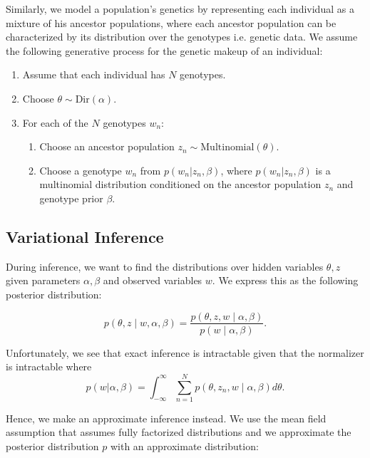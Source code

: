 \documentclass[a4paper]{article}
\begin{document}
	Similarly, we model a population's genetics by representing each individual as a mixture of his ancestor populations, where each ancestor population can be characterized by its distribution over the genotypes i.e. genetic data. We assume the following generative process for the genetic makeup of an individual:

	\begin{enumerate}[noitemsep]
		\item Assume that each individual has $N$ genotypes. 
		\item Choose $\theta \sim \mathrm{Dir}(\alpha)$.
		\item For each of the $N$ genotypes $w_n$:
		\begin{enumerate}
			\item Choose an ancestor population $z_n \sim \mathrm{Multinomial}(\theta)$.
			\item Choose a genotype $w_n$ from $p(w_n|z_n,\beta)$, where $p(w_n|z_n,\beta)$ is a multinomial distribution conditioned on the ancestor population $z_n$ and genotype prior $\beta$.
		\end{enumerate}
	\end{enumerate}
	
	\subsection{Variational Inference}
	
	During inference, we want to find the distributions over hidden variables $\theta, z$ given parameters $\alpha, \beta$ and observed variables $w$. We express this as the following posterior distribution:
	
	\begin{equation}
		p(\theta,z \mid w,\alpha,\beta) = \frac{p(\theta,z,w\mid \alpha,\beta)}{p(w\mid \alpha,\beta)}.
	\end{equation}
	
	\noindent Unfortunately, we see that exact inference is intractable given that the normalizer is intractable where
	\begin{equation}
		p(w | \alpha, \beta) = \int_{-\infty}^{\infty} \sum_{n=1}^N p(\theta,z_n,w\mid\alpha,\beta) d\theta.
	\end{equation}
	
	\noindent Hence, we make an approximate inference instead. We use the mean field assumption that assumes fully factorized distributions and we approximate the posterior distribution $p$ with an approximate distribution: 
	
\end{document}
